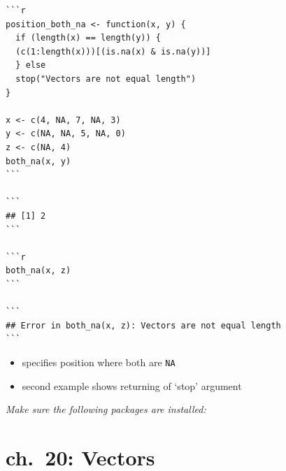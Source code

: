 \documentclass[]{book}
\newenvironment{Shaded}{\begin{snugshade}}{\end{snugshade}}
\newcommand{\DataTypeTok}[1]{\textcolor[rgb]{0.13,0.29,0.53}{#1}}
\newcommand{\KeywordTok}[1]{\textcolor[rgb]{0.13,0.29,0.53}{\textbf{#1}}}
\newcommand{\NormalTok}[1]{#1}
\newcommand{\OperatorTok}[1]{\textcolor[rgb]{0.81,0.36,0.00}{\textbf{#1}}}
\newcommand{\OtherTok}[1]{\textcolor[rgb]{0.56,0.35,0.01}{#1}}
\providecommand{\tightlist}{%
  \setlength{\itemsep}{0pt}\setlength{\parskip}{0pt}}
\theoremstyle{definition}
\theoremstyle{definition}
\theoremstyle{definition}
\theoremstyle{remark}
\begin{document}
\begin{verbatim}
```r
position_both_na <- function(x, y) {
  if (length(x) == length(y)) {
  (c(1:length(x)))[(is.na(x) & is.na(y))]
  } else
  stop("Vectors are not equal length")
}

x <- c(4, NA, 7, NA, 3)
y <- c(NA, NA, 5, NA, 0)
z <- c(NA, 4)
both_na(x, y)
```

```
## [1] 2
```

```r
both_na(x, z)
```

```
## Error in both_na(x, z): Vectors are not equal length
```
\end{verbatim}

\begin{itemize}
\tightlist
\item
  specifies position where both are \texttt{NA}
\item
  second example shows returning of `stop' argument
\end{itemize}

\emph{Make sure the following packages are installed:}

\begin{Shaded}
\end{Shaded}

\hypertarget{ch.-20-vectors}{%
\chapter{ch.~20: Vectors}\label{ch.-20-vectors}}
\end{document}
